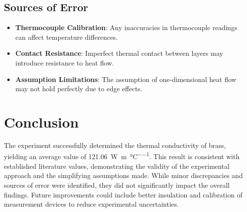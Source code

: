 \documentclass[12pt]{article}
\begin{document}
\subsection{Sources of Error}

\begin{itemize}
    \item \textbf{Thermocouple Calibration}: Any inaccuracies in thermocouple readings can affect temperature differences.
    \item \textbf{Contact Resistance}: Imperfect thermal contact between layers may introduce resistance to heat flow.
    \item \textbf{Assumption Limitations}: The assumption of one-dimensional heat flow may not hold perfectly due to edge effects.
\end{itemize}

\section{Conclusion}

The experiment successfully determined the thermal conductivity of brass, yielding an average value of \SI{121.06}{\watt\per\meter\per\celsius}. This result is consistent with established literature values, demonstrating the validity of the experimental approach and the simplifying assumptions made. While minor discrepancies and sources of error were identified, they did not significantly impact the overall findings. Future improvements could include better insulation and calibration of measurement devices to reduce experimental uncertainties.
\end{document}
